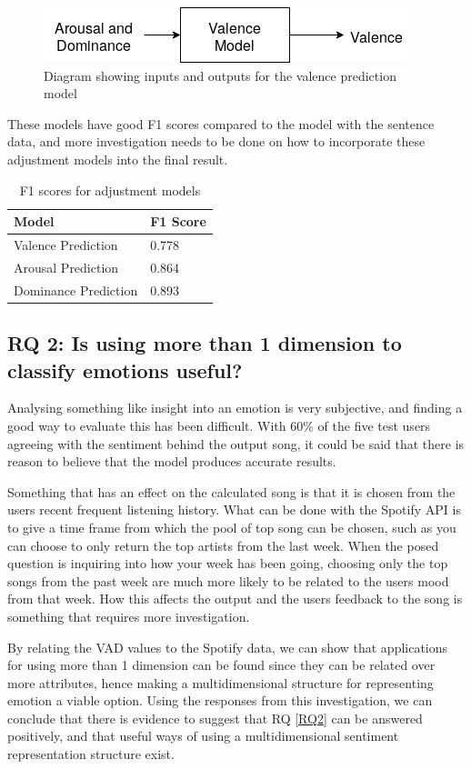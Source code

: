 \begin{figure}[ht]
\centering
\includegraphics[scale=0.6]{implementation/adjustModel.png}
\caption{Diagram showing inputs and outputs for the valence prediction model}
\label{model:adjust}
\end{figure}

These models have good F1 scores compared to the model with the sentence data, and more investigation needs to be done on how to incorporate these adjustment models into the final result. 

\begin{table}[h]
\centering
\caption{F1 scores for adjustment models}
\begin{tabular}{|l|l|}
\hline
Model & F1 Score \\ \hline
 Valence Prediction &  0.778\\
 Arousal Prediction &  0.864\\
 Dominance Prediction &  0.893\\
 \hline
\end{tabular}
\label{f1:adj}
\end{table}

\subsection{RQ 2: Is using more than 1 dimension to classify emotions useful?}

Analysing something like insight into an emotion is very subjective, and finding a good way to evaluate this has been difficult. With 60\% of the five test users agreeing with the sentiment behind the output song, it could be said that there is reason to believe that the model produces accurate results. 

Something that has an effect on the calculated song is that it is chosen from the users recent frequent listening history.
What can be done with the Spotify API is to give a time frame from which the pool of top song can be chosen, such as you can choose to only return the top artists from the last week. When the posed question is inquiring into how your week has been going, choosing only the top songs from the past week are much more likely to be related to the users mood from that week. How this affects the output and the users feedback to the song is something that requires more investigation. 

By relating the VAD values to the Spotify data, we can show that applications for using more than 1 dimension can be found since they can be related over more attributes, hence making a multidimensional structure for representing emotion a viable option. Using the responses from this investigation, we can conclude that there is evidence to suggest that RQ \ref{RQ2} can be answered positively, and that useful ways of using a multidimensional sentiment representation structure exist.

